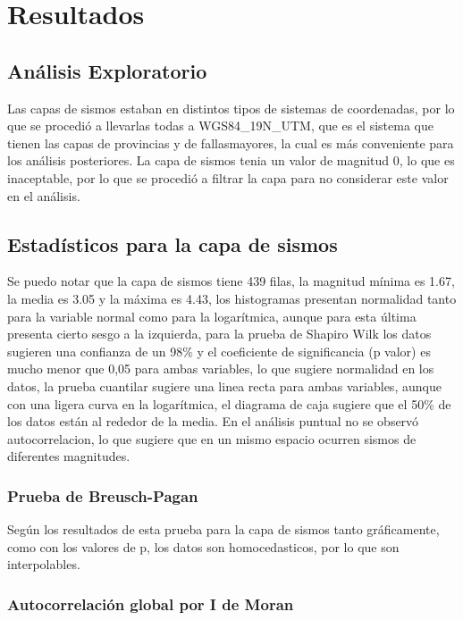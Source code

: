 \documentclass[11pt,]{article}
\begin{document}
\section{Resultados}\label{resultados}

\subsection{Análisis Exploratorio}\label{anuxe1lisis-exploratorio}

Las capas de sismos estaban en distintos tipos de sistemas de
coordenadas, por lo que se procedió a llevarlas todas a WGS84\_19N\_UTM,
que es el sistema que tienen las capas de provincias y de fallasmayores,
la cual es más conveniente para los análisis posteriores. La capa de
sismos tenia un valor de magnitud 0, lo que es inaceptable, por lo que
se procedió a filtrar la capa para no considerar este valor en el
análisis.

\subsection{Estadísticos para la capa de
sismos}\label{estaduxedsticos-para-la-capa-de-sismos}

Se puedo notar que la capa de sismos tiene 439 filas, la magnitud mínima
es 1.67, la media es 3.05 y la máxima es 4.43, los histogramas presentan
normalidad tanto para la variable normal como para la logarítmica,
aunque para esta última presenta cierto sesgo a la izquierda, para la
prueba de Shapiro Wilk los datos sugieren una confianza de un 98\% y el
coeficiente de significancia (p valor) es mucho menor que 0,05 para
ambas variables, lo que sugiere normalidad en los datos, la prueba
cuantilar sugiere una linea recta para ambas variables, aunque con una
ligera curva en la logarítmica, el diagrama de caja sugiere que el 50\%
de los datos están al rededor de la media. En el análisis puntual no se
observó autocorrelacion, lo que sugiere que en un mismo espacio ocurren
sismos de diferentes magnitudes.

\subsubsection{Prueba de Breusch-Pagan}\label{prueba-de-breusch-pagan}

Según los resultados de esta prueba para la capa de sismos tanto
gráficamente, como con los valores de p, los datos son homocedasticos,
por lo que son interpolables.

\subsubsection{Autocorrelación global por I de
Moran}\label{autocorrelaciuxf3n-global-por-i-de-moran}
\end{document}

